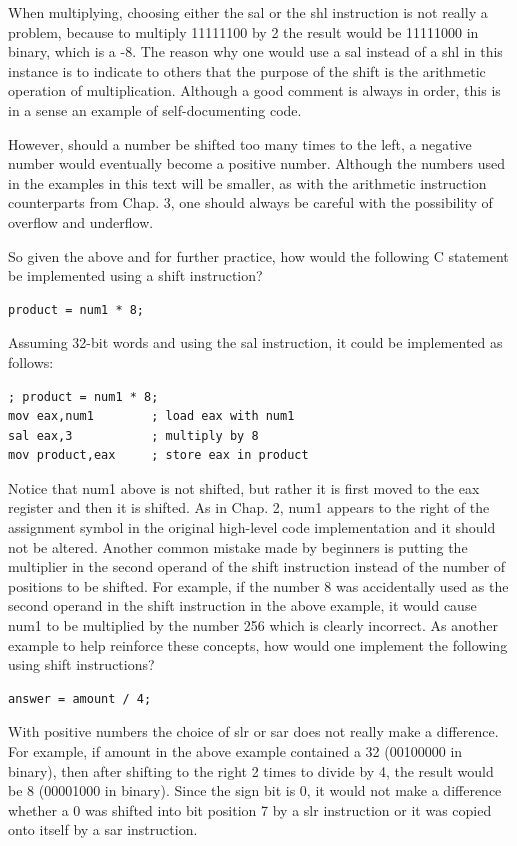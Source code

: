 \documentclass[10pt]{book}
\begin{document}
When multiplying, choosing either the sal or the shl instruction is not really a problem, because to multiply 11111100 by 2 the result would be 11111000 in binary, which is a -8. The reason why one would use a sal instead of a shl in this instance is to indicate to others that the purpose of the shift is the arithmetic operation of multiplication. Although a good comment is always in order, this is in a sense an example of self-documenting code.

However, should a number be shifted too many times to the left, a negative number would eventually become a positive number. Although the numbers used in the examples in this text will be smaller, as with the arithmetic instruction counterparts from Chap. 3, one should always be careful with the possibility of overflow and underflow.

So given the above and for further practice, how would the following C statement be implemented using a shift instruction?

\begin{verbatim}
product = num1 * 8;
\end{verbatim}

Assuming 32-bit words and using the sal instruction, it could be implemented as follows:

\begin{verbatim}
; product = num1 * 8;
mov eax,num1        ; load eax with num1
sal eax,3           ; multiply by 8
mov product,eax     ; store eax in product
\end{verbatim}

Notice that num1 above is not shifted, but rather it is first moved to the eax register and then it is shifted. As in Chap. 2, num1 appears to the right of the assignment symbol in the original high-level code implementation and it should not be altered. Another common mistake made by beginners is putting the multiplier in the second operand of the shift instruction instead of the number of positions to be shifted. For example, if the number 8 was accidentally used as the second operand in the shift instruction in the above example, it would cause num1 to be multiplied by the number 256 which is clearly incorrect. As another example to help reinforce these concepts, how would one implement the following using shift instructions?

\begin{verbatim}
answer = amount / 4;
\end{verbatim}

With positive numbers the choice of slr or sar does not really make a difference. For example, if amount in the above example contained a 32 (00100000 in binary), then after shifting to the right 2 times to divide by 4, the result would be 8 (00001000 in binary). Since the sign bit is 0, it would not make a difference whether a 0 was shifted into bit position 7 by a slr instruction or it was copied onto itself by a sar instruction.
\end{document}

